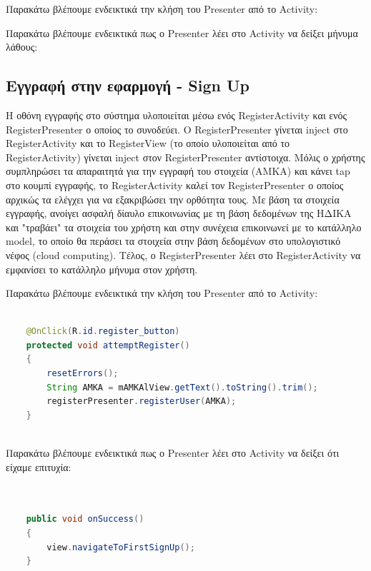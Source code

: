    		Παρακάτω βλέπουμε ενδεικτικά την κλήση του Presenter από το Activity:
   		
		
		Παρακάτω βλέπουμε ενδεικτικά πως ο Presenter λέει στο Activity να δείξει μήνυμα λάθους:
		



\subsection{Εγγραφή στην εφαρμογή - Sign Up}	

		

   		Η οθόνη εγγραφής στο σύστημα υλοποιείται μέσω ενός RegisterActivity και ενός RegisterPresenter ο οποίος το συνοδεύει. Ο RegisterPresenter γίνεται inject στο RegisterActivity και το RegisterView (το οποίο υλοποιείται από το RegisterActivity) γίνεται inject στον RegisterPresenter αντίστοιχα. Μόλις ο χρήστης συμπληρώσει τα απαραιτητά για την εγγραφή του στοιχεία (ΑΜΚΑ) και κάνει tap στο κουμπί εγγραφής, το RegisterActivity καλεί τον RegisterPresenter ο οποίος αρχικώς τα ελέγχει για να εξακριβώσει την ορθότητα τους. Με βάση τα στοιχεία εγγραφής, ανοίγει ασφαλή δίαυλο επικοινωνίας με τη βάση δεδομένων της ΗΔΙΚΑ και "τραβάει" τα στοιχεία του χρήστη και στην συνέχεια επικοινωνεί με το κατάλληλο model, το οποίο θα περάσει τα στοιχεία στην βάση δεδομένων στο υπολογιστικό νέφος (cloud computing). Τέλος, ο RegisterPresenter λέει στο RegisterActivity να εμφανίσει το κατάλληλο μήνυμα στον χρήστη.
   
   		
   		Παρακάτω βλέπουμε ενδεικτικά την κλήση του Presenter από το Activity:
   			
   			
   				\begin{lstlisting}[language=Java]			
		
    @OnClick(R.id.register_button)
    protected void attemptRegister()
    {
        resetErrors();
        String AMKA = mAMKAlView.getText().toString().trim();
        registerPresenter.registerUser(AMKA);
    }
    
		\end{lstlisting}
		
		Παρακάτω βλέπουμε ενδεικτικά πως ο Presenter λέει στο Activity να δείξει ότι είχαμε επιτυχία:
	
	
   	\begin{lstlisting}[language=Java]			

	
	public void onSuccess()
    {
        view.navigateToFirstSignUp();
    }
    
    	\end{lstlisting}
	

